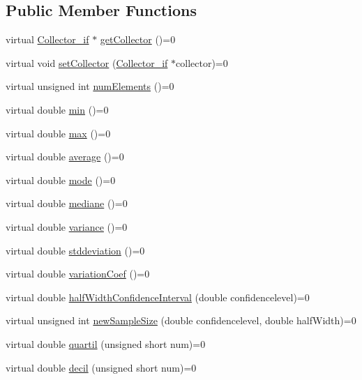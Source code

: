\subsection*{Public Member Functions}
\begin{DoxyCompactItemize}
\item 
virtual \hyperlink{class_collector__if}{Collector\-\_\-if} $\ast$ \hyperlink{class_statistics__if_a49a730541ca9a3d8272f39f4000485c4}{get\-Collector} ()=0
\item 
virtual void \hyperlink{class_statistics__if_a203ffe8e5215e887b716b7810023adc6}{set\-Collector} (\hyperlink{class_collector__if}{Collector\-\_\-if} $\ast$collector)=0
\item 
virtual unsigned int \hyperlink{class_statistics__if_a1e76d98f8a61fe03df9e36194eaa5722}{num\-Elements} ()=0
\item 
virtual double \hyperlink{class_statistics__if_acdeb9880a7362e9105871c7fb3f65db6}{min} ()=0
\item 
virtual double \hyperlink{class_statistics__if_a24e3652122f2ec649b4c7d3accc43da0}{max} ()=0
\item 
virtual double \hyperlink{class_statistics__if_a791ab6bbd166254429a3131bdf6e8dd6}{average} ()=0
\item 
virtual double \hyperlink{class_statistics__if_a43b850db407a9a64ab3e2f4d06eab350}{mode} ()=0
\item 
virtual double \hyperlink{class_statistics__if_a0414c1df9272ca674cba6fc30f027684}{mediane} ()=0
\item 
virtual double \hyperlink{class_statistics__if_a1b563f7e92eda3cf3a8f47f07824b96b}{variance} ()=0
\item 
virtual double \hyperlink{class_statistics__if_a88d2478c6dfd8de19436ab248080a509}{stddeviation} ()=0
\item 
virtual double \hyperlink{class_statistics__if_ae0ad6bf18f8263003b0ac7552318be57}{variation\-Coef} ()=0
\item 
virtual double \hyperlink{class_statistics__if_a093e08a43aefa0738f94ea4f68eaa40d}{half\-Width\-Confidence\-Interval} (double confidencelevel)=0
\item 
virtual unsigned int \hyperlink{class_statistics__if_a041cafef3eb831901296987871f707f0}{new\-Sample\-Size} (double confidencelevel, double half\-Width)=0
\item 
virtual double \hyperlink{class_statistics__if_af85daafcb428420ceeacdd4807c045eb}{quartil} (unsigned short num)=0
\item 
virtual double \hyperlink{class_statistics__if_a562230cad7a31c8af403217743b156f3}{decil} (unsigned short num)=0

\end{DoxyCompactItemize}
